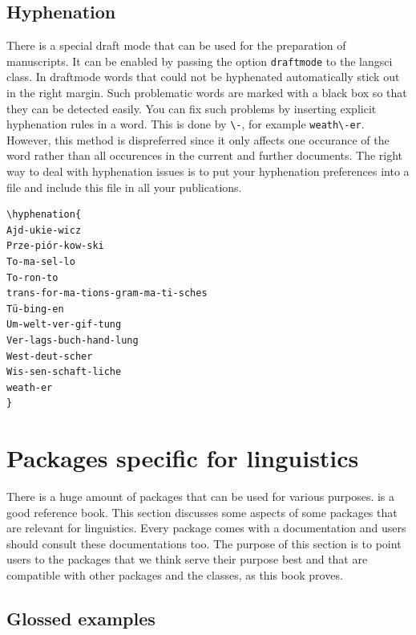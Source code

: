 
\subsection{Hyphenation}

There is a special draft mode that can be used for the preparation of manuscripts. It can be enabled
by passing the option \texttt{draftmode} to the langsci class. In draftmode words that could not be
hyphenated automatically stick out in the right margin. Such problematic words are marked with a
black box so that they can be detected easily. You can fix such problems by inserting explicit
hyphenation rules in a word. This is done by \verb+\-+, for example \verb+weath\-er+. However, this
method is dispreferred since it only affects one occurance of the word rather than all occurences in
the current and further documents. The right way to deal with hyphenation issues is to put your
hyphenation preferences into a file and include this file in all your publications. 

\begin{verbatim}
\hyphenation{
Ajd-ukie-wicz
Prze-piór-kow-ski
To-ma-sel-lo
To-ron-to
trans-for-ma-tions-gram-ma-ti-sches
Tü-bing-en
Um-welt-ver-gif-tung
Ver-lags-buch-hand-lung
West-deut-scher
Wis-sen-schaft-liche
weath-er
}
\end{verbatim}

%



\section{Packages specific for linguistics}

There is a huge amount of packages that can be used for various purposes.  is a good
reference book. This section discusses some aspects of some packages that are relevant for
linguistics. Every \latex package comes with a documentation and users should consult these
documentations too. The purpose of this section is to point users to the packages that we think
serve their purpose best and that are compatible with other packages and the \lsp classes, as this
book proves.

\subsection{Glossed examples}

